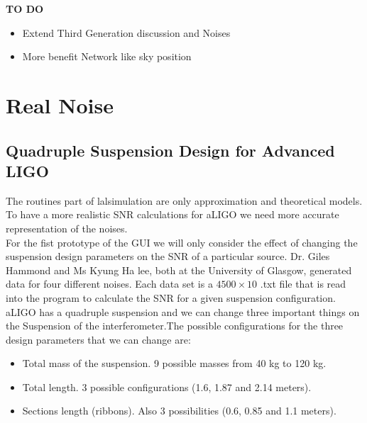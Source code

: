 \documentclass[11pt,fleqn]{book} %
\begin{document}
{\large \textbf{TO DO}}
\begin{itemize}
	\item Extend Third Generation discussion and Noises
	\item More benefit Network like sky position
\end{itemize}



\chapter{Real Noise}


\section{Quadruple Suspension Design for Advanced LIGO}

The routines part of lalsimulation are only approximation and theoretical models. To have a more realistic SNR calculations for aLIGO  we need more accurate representation of the noises. \\

For the fist prototype of the GUI we will only consider the effect of changing the suspension design parameters on the SNR of a particular source. Dr. Giles Hammond and Ms Kyung Ha lee, both at the University of Glasgow, generated data for four different noises. Each data set is a $4500 \times 10$ .txt file that is read into the program to calculate the SNR for a given suspension configuration. aLIGO has a quadruple suspension and we can change three important things on the Suspension of the interferometer.The possible configurations for the three design parameters that we can change are:\\

\begin{itemize}
	\item Total mass of the suspension. 9 possible masses from 40 kg to 120 kg.
	\item Total length. 3 possible configurations (1.6, 1.87 and 2.14 meters).
	\item Sections length (ribbons). Also 3 possibilities (0.6, 0.85 and 1.1 meters). \\
\end{itemize}
\end{document}
